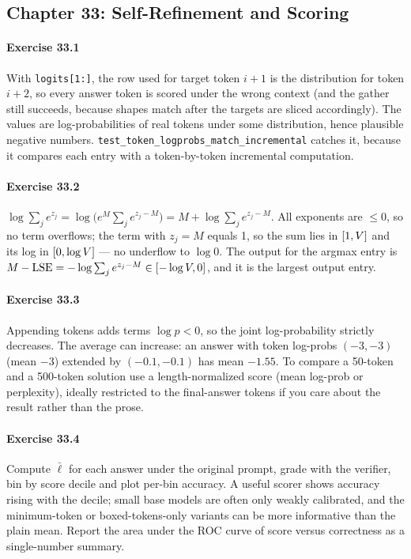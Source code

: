 \subsection*{Chapter 33: Self-Refinement and Scoring}

\paragraph{Exercise 33.1} With \texttt{logits[1:]}, the row used for target token $i{+}1$ is the
distribution for token $i{+}2$, so every answer token is scored under the wrong context (and the
gather still succeeds, because shapes match after the targets are sliced accordingly). The values are
log-probabilities of real tokens under some distribution, hence plausible negative numbers.
\texttt{test\_token\_logprobs\_match\_incremental} catches it, because it compares each entry with a
token-by-token incremental computation.

\paragraph{Exercise 33.2} $\log\sum_j e^{z_j} = \log\bigl(e^M\sum_j e^{z_j - M}\bigr) = M + \log\sum_j
e^{z_j-M}$. All exponents are $\le 0$, so no term overflows; the term with $z_j = M$ equals 1, so the
sum lies in $[1, V]$ and its log in $[0, \log V]$ --- no underflow to $\log 0$. The output for
the argmax entry is $M - \mathrm{LSE} = -\log\sum_j e^{z_j - M} \in [-\log V, 0]$, and it is the
largest output entry.

\paragraph{Exercise 33.3} Appending tokens adds terms $\log p < 0$, so the joint log-probability
strictly decreases. The average can increase: an answer with token log-probs $(-3, -3)$ (mean $-3$)
extended by $(-0.1, -0.1)$ has mean $-1.55$. To compare a 50-token and a 500-token solution use a
length-normalized score (mean log-prob or perplexity), ideally restricted to the final-answer tokens
if you care about the result rather than the prose.

\paragraph{Exercise 33.4} Compute $\bar\ell$ for each answer under the original prompt, grade with the
verifier, bin by score decile and plot per-bin accuracy. A useful scorer shows accuracy rising with
the decile; small base models are often only weakly calibrated, and the minimum-token or
boxed-tokens-only variants can be more informative than the plain mean. Report the area under the
ROC curve of score versus correctness as a single-number summary.


